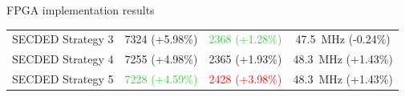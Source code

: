 \begin{frame}{FPGA implementation results}
\begin{table}[t]
\begin{tabular}{@{}rccc@{}}
            SECDED Strategy 3          & \num{7324} {\tiny (+5.98\%)}                        & \textcolor{LimeGreen}{\num{2368} {\tiny (+1.28\%)}} & \SI{47.5}{\mega\hertz} {\tiny (-0.24\%)} \\
            SECDED Strategy 4          & \num{7255} {\tiny (+4.98\%)}                        & \num{2365} {\tiny (+1.93\%)}                        & \SI{48.3}{\mega\hertz} {\tiny (+1.43\%) } \\
            SECDED Strategy 5          & \textcolor{LimeGreen}{\num{7228} {\tiny (+4.59\%)}} & \textcolor{red}{\num{2428} {\tiny (+3.98\%)}}       & \SI{48.3}{\mega\hertz} {\tiny (+1.43\%) } \\
            \bottomrule
        \end{tabular}
    \end{table}
    
\end{frame}
